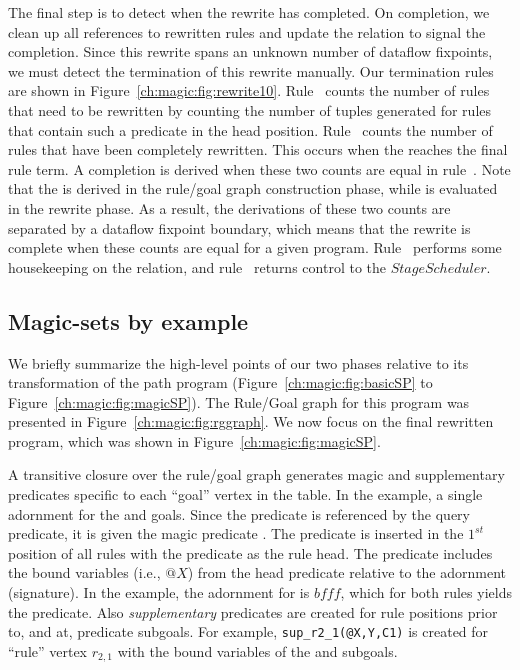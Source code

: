 The final step is to detect when the rewrite has completed.  On completion, we
clean up all references to rewritten rules and update the  relation
to signal the completion.  Since this rewrite spans an unknown number of
dataflow fixpoints, we must detect the termination of this rewrite manually.
Our termination rules are shown in Figure~\ref{ch:magic:fig:rewrite10}.
Rule~ counts the number of rules that need to be rewritten by counting
the number of  tuples generated for rules that contain such
a predicate in the head position.  Rule~ counts the number of rules
that have been completely rewritten.  This occurs when the 
reaches the final rule term.  A completion is derived when these two counts are
equal in rule~.  Note that the  is derived in the
rule/goal graph construction phase, while  is evaluated in
the rewrite phase.  As a result, the derivations of these two counts are
separated by a dataflow fixpoint boundary, which means that the rewrite is complete
when these counts are equal for a given program.  Rule~ performs some
housekeeping on the  relation, and rule~ returns control to
the $StageScheduler$.

\subsection{Magic-sets by example}

We briefly summarize the high-level points of our two phases relative to its
transformation of the path program (Figure~\ref{ch:magic:fig:basicSP} to
Figure~\ref{ch:magic:fig:magicSP}).  The Rule/Goal graph for this program was
presented in Figure~\ref{ch:magic:fig:rggraph}.  We now focus on the final
rewritten program, which was shown in Figure~\ref{ch:magic:fig:magicSP}.

A transitive closure over the rule/goal graph generates magic and supplementary
predicates specific to each ``goal'' vertex in the  table.  In
the example, a single adornment for the  and  goals.  Since
the  predicate is referenced by the query predicate, it is given the
magic predicate .  The  predicate is inserted
in the $1^{st}$ position of all rules with the  predicate as the rule
head.  The  predicate includes the bound variables (i.e., $@X$)
from the  head predicate relative to the  adornment
(signature).  In the example, the adornment for  is $bfff$, which for
both rules yields the  predicate.  Also
{\em supplementary} predicates are created for rule positions prior to, and
at,  predicate subgoals.  For example, {\tt sup\_r2\_1(@X,Y,C1)} is
created for ``rule'' vertex $r_{2,1}$ with the bound variables of the
 and  subgoals.

